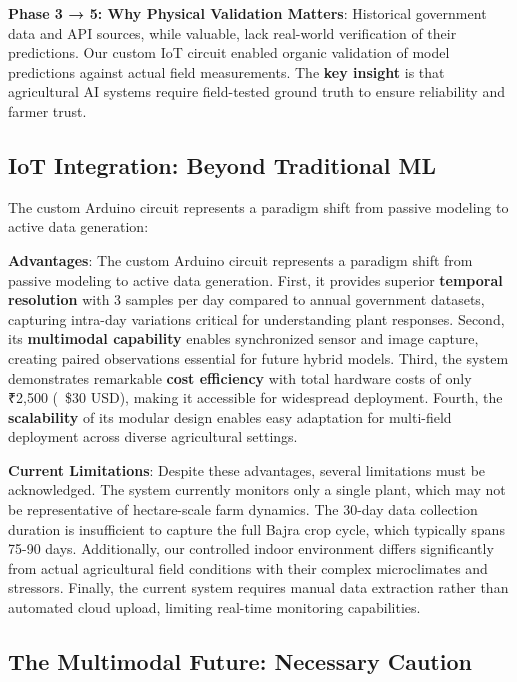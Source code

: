 \documentclass[10pt,twocolumn]{article}
\begin{document}
\textbf{Phase 3 → 5: Why Physical Validation Matters}: Historical government data and API sources, while valuable, lack real-world verification of their predictions. Our custom IoT circuit enabled organic validation of model predictions against actual field measurements. The \textbf{key insight} is that agricultural AI systems require field-tested ground truth to ensure reliability and farmer trust.

\subsection{IoT Integration: Beyond Traditional ML}

The custom Arduino circuit represents a paradigm shift from passive modeling to active data generation:

\textbf{Advantages}: The custom Arduino circuit represents a paradigm shift from passive modeling to active data generation. First, it provides superior \textbf{temporal resolution} with 3 samples per day compared to annual government datasets, capturing intra-day variations critical for understanding plant responses. Second, its \textbf{multimodal capability} enables synchronized sensor and image capture, creating paired observations essential for future hybrid models. Third, the system demonstrates remarkable \textbf{cost efficiency} with total hardware costs of only ₹2,500 (~\$30 USD), making it accessible for widespread deployment. Fourth, the \textbf{scalability} of its modular design enables easy adaptation for multi-field deployment across diverse agricultural settings.

\textbf{Current Limitations}: Despite these advantages, several limitations must be acknowledged. The system currently monitors only a single plant, which may not be representative of hectare-scale farm dynamics. The 30-day data collection duration is insufficient to capture the full Bajra crop cycle, which typically spans 75-90 days. Additionally, our controlled indoor environment differs significantly from actual agricultural field conditions with their complex microclimates and stressors. Finally, the current system requires manual data extraction rather than automated cloud upload, limiting real-time monitoring capabilities.

\subsection{The Multimodal Future: Necessary Caution}
\end{document}
